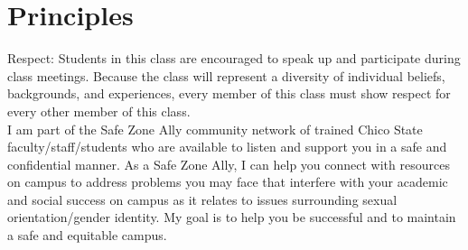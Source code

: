 \documentclass[12pt]{article}
\begin{document}
  \section*{Principles}
  \noindent
  Respect: Students in this class are encouraged to speak up and participate during class meetings. Because the class will represent a diversity of individual beliefs, backgrounds, and experiences, every member of this class must show respect for every other member of this class. \\
  \newline
  I am part of the Safe Zone Ally community network of trained Chico State faculty/staff/students who are available to listen and support you in a safe and confidential manner. As a Safe Zone Ally, I can help you connect with resources on campus to address problems you may face that interfere with your academic and social success on campus as it relates to issues surrounding sexual orientation/gender identity. My goal is to help you be successful and to maintain a safe and equitable campus.
\end{document}
